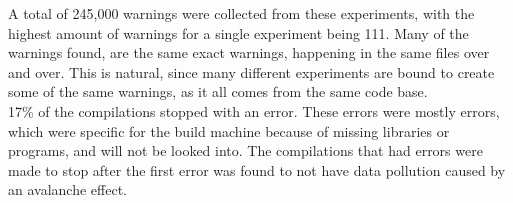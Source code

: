 \documentclass[a4paper,11pt]{report}
\begin{document}
A total of 245,000 warnings were collected from these experiments, with the 
highest amount of warnings for a single experiment being 111.  Many of the 
warnings found, are the same exact warnings, happening in the same files over 
and over. This is natural, since many different experiments are bound to create 
some of the same warnings, as it all comes from the same code base.
\\

17\% of the compilations stopped with an error. These errors were mostly 
errors, which were specific for the build machine because of missing libraries 
or programs, and will not be looked into.  The compilations that had errors 
were made to stop after the first error was found to not have data pollution 
caused by an avalanche effect.
\\


\end{document}
